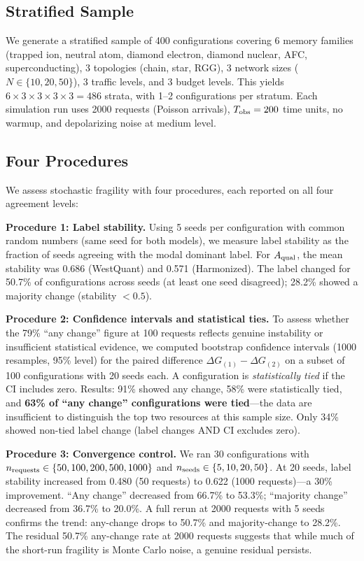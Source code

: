 \documentclass[aps,prapplied,reprint,superscriptaddress]{revtex4-2}
\newcommand{\DG}{\Delta G}
\newcommand{\Aqual}{A_{\rm qual}}
\begin{document}
\subsection{Stratified Sample}

We generate a stratified sample of 400 configurations covering 6 memory families (trapped ion, neutral atom, diamond electron, diamond nuclear, AFC, superconducting), 3 topologies (chain, star, RGG), 3 network sizes ($N \in \{10, 20, 50\}$), 3 traffic levels, and 3 budget levels. This yields $6 \times 3 \times 3 \times 3 \times 3 = 486$ strata, with 1--2 configurations per stratum. Each simulation run uses 2000 requests (Poisson arrivals), $T_{\rm obs} = 200$ time units, no warmup, and depolarizing noise at medium level.

\subsection{Four Procedures}

We assess stochastic fragility with four procedures, each reported on all four agreement levels:

\textbf{Procedure 1: Label stability.} Using 5 seeds per configuration with common random numbers (same seed for both models), we measure label stability as the fraction of seeds agreeing with the modal dominant label. For $\Aqual$, the mean stability was 0.686 (WestQuant) and 0.571 (Harmonized). The label changed for 50.7\% of configurations across seeds (at least one seed disagreed); 28.2\% showed a majority change (stability $< 0.5$).

\textbf{Procedure 2: Confidence intervals and statistical ties.} To assess whether the 79\% ``any change'' figure at 100 requests reflects genuine instability or insufficient statistical evidence, we computed bootstrap confidence intervals (1000 resamples, 95\% level) for the paired difference $\DG_{(1)} - \DG_{(2)}$ on a subset of 100 configurations with 20 seeds each. A configuration is \emph{statistically tied} if the CI includes zero. Results: 91\% showed any change, 58\% were statistically tied, and \textbf{63\% of ``any change'' configurations were tied}---the data are insufficient to distinguish the top two resources at this sample size. Only 34\% showed non-tied label change (label changes AND CI excludes zero).

\textbf{Procedure 3: Convergence control.} We ran 30 configurations with $n_{\rm requests} \in \{50, 100, 200, 500, 1000\}$ and $n_{\rm seeds} \in \{5, 10, 20, 50\}$. At 20 seeds, label stability increased from 0.480 (50 requests) to 0.622 (1000 requests)---a 30\% improvement. ``Any change'' decreased from 66.7\% to 53.3\%; ``majority change'' decreased from 36.7\% to 20.0\%. A full rerun at 2000 requests with 5 seeds confirms the trend: any-change drops to 50.7\% and majority-change to 28.2\%. The residual 50.7\% any-change rate at 2000 requests suggests that while much of the short-run fragility is Monte Carlo noise, a genuine residual persists.
\end{document}
